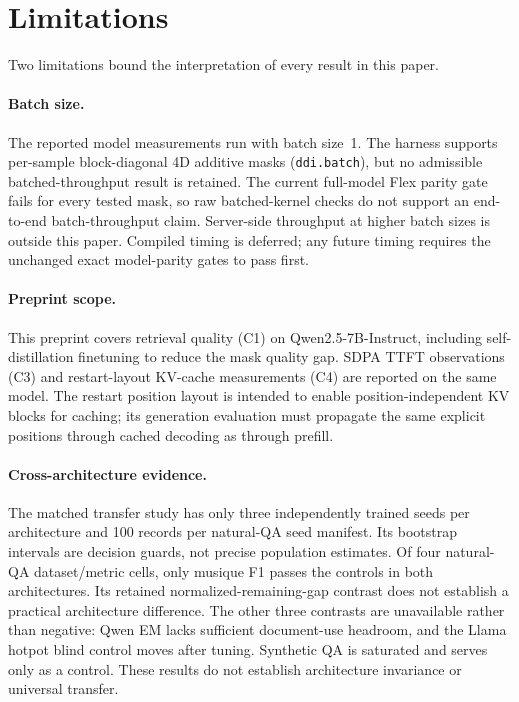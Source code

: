 \section{Limitations}
\label{sec:limitations}

Two limitations bound the interpretation of every result in this paper.

\paragraph{Batch size.}
The reported model measurements run with batch size~1. The harness supports
per-sample block-diagonal 4D additive masks (\texttt{ddi.batch}), but no
admissible batched-throughput result is retained. The current full-model Flex
parity gate fails for every tested mask, so raw batched-kernel checks do not
support an end-to-end batch-throughput claim. Server-side throughput at higher
batch sizes is outside this paper. Compiled timing is deferred; any future timing
requires the unchanged exact model-parity gates to pass first.

\paragraph{Preprint scope.}
This preprint covers retrieval quality (C1) on Qwen2.5-7B-Instruct, including
self-distillation finetuning to reduce the mask quality gap. SDPA TTFT
observations (C3) and restart-layout KV-cache measurements (C4) are
reported on the same model. The restart position layout is intended to enable
position-independent KV blocks for caching;
its generation evaluation must propagate the same explicit positions through
cached decoding as through prefill.

\paragraph{Cross-architecture evidence.}
The matched transfer study has only three independently trained seeds per
architecture and 100 records per natural-QA seed manifest. Its bootstrap
intervals are decision guards, not precise population estimates. Of four
natural-QA dataset/metric cells, only musique F1 passes the controls in both
architectures. Its retained normalized-remaining-gap contrast does not establish a practical
architecture difference. The other three contrasts are unavailable rather
than negative: Qwen EM lacks sufficient document-use headroom, and the Llama
hotpot blind control moves after tuning. Synthetic QA is saturated and serves
only as a control. These results do not establish architecture invariance or
universal transfer.

